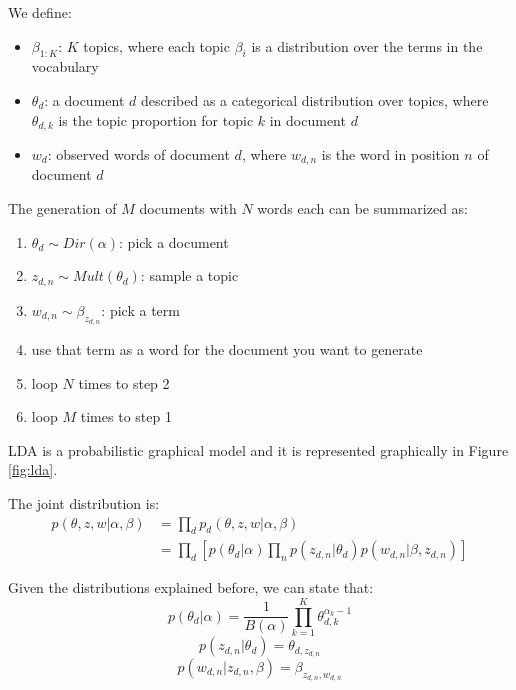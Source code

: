 We define:
\begin{itemize}
    \item $\beta_{1:K}$: $K$ topics, where each topic $\beta_i$ is a distribution over the terms in the vocabulary
    \item $\theta_d$: a document $d$ described as a categorical distribution over topics, where $\theta_{d,k}$ is the topic proportion for topic $k$ in document $d$
    \item $w_{d}$: observed words of document $d$, where $w_{d,n}$ is the word in position $n$ of document $d$
\end{itemize}

The generation of $M$ documents with $N$ words each can be summarized as:
\begin{enumerate}
    \item $\theta_d \sim Dir(\alpha)$: pick a document
    \item $z_{d,n} \sim Mult(\theta_d)$: sample a topic
    \item $w_{d,n} \sim \beta_{z_{d,n}}$: pick a term
    \item use that term as a word for the document you want to generate
    \item loop $N$ times to step 2
    \item loop $M$ times to step 1
\end{enumerate}

LDA is a probabilistic graphical model and it is represented graphically in Figure \ref{fig:lda}.

The joint distribution is:
\begin{equation*}
    \begin{split}
        p(\theta, z, w | \alpha, \beta) & = \prod_d p_d(\theta, z, w | \alpha, \beta) \\
        & = \prod_d [p(\theta_d | \alpha) \prod_n p(z_{d,n} | \theta_d) p(w_{d, n} | \beta, z_{d,n})]
    \end{split}
\end{equation*}

Given the distributions explained before, we can state that:
\[ p(\theta_d | \alpha) = \frac{1}{B(\alpha)} \prod_{k=1}^K \theta_{d,k}^{\alpha_k - 1} \]
\[ p(z_{d,n} | \theta_d) = \theta_{d, z_{d,n}} \]
\[ p(w_{d,n} | z_{d,n}, \beta) = \beta_{z_{d,n},w_{d,n}} \]

